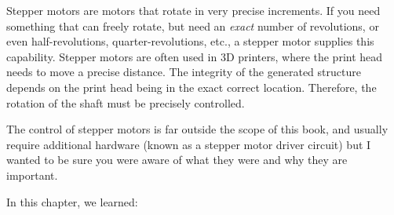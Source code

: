 Stepper motors are motors that rotate in very precise increments.
If you need something that can freely rotate, but need an \emph{exact} number of revolutions, or even half-revolutions, quarter-revolutions, etc., a stepper motor supplies this capability.
Stepper motors are often used in 3D printers, where the print head needs to move a precise distance.  
The integrity of the generated structure depends on the print head being in the exact correct location.
Therefore, the rotation of the shaft must be precisely controlled.

The control of stepper motors is far outside the scope of this book, and usually require additional hardware (known as a stepper motor driver circuit) but I wanted to be sure you were aware of what they were and why they are important.

\reviewsection

In this chapter, we learned:

